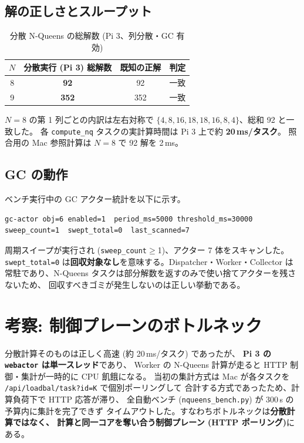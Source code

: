 \documentclass[a4paper,11pt]{ltjsarticle}
\begin{document}
\subsection{解の正しさとスループット}
\begin{table}[h]\centering
\begin{tabular}{cccc}
\toprule
$N$ & 分散実行 (Pi 3) 総解数 & 既知の正解 & 判定 \\
\midrule
8 & \textbf{92}  & 92  & 一致 \\
9 & \textbf{352} & 352 & 一致 \\
\bottomrule
\end{tabular}
\caption{分散 N-Queens の総解数 (Pi 3、列分散・GC 有効)}
\end{table}

$N=8$ の第 1 列ごとの内訳は左右対称で
$\{4,8,16,18,18,16,8,4\}$、総和 92 と一致した。
各 \texttt{compute\_nq} タスクの実計算時間は Pi 3 上で約 \textbf{20\,ms/タスク}。
照合用の Mac 参照計算は $N=8$ で 92 解を 2\,ms。

\subsection{GC の動作}
ベンチ実行中の GC アクター統計を以下に示す。
\begin{lstlisting}
gc-actor obj=6 enabled=1  period_ms=5000 threshold_ms=30000
sweep_count=1  swept_total=0  last_scanned=7
\end{lstlisting}
周期スイープが実行され (\texttt{sweep\_count}$\ge$1)、アクター 7 体をスキャンした。
\texttt{swept\_total=0} は\textbf{回収対象なし}を意味する。Dispatcher・Worker・Collector
は常駐であり、N-Queens タスクは部分解数を返すのみで使い捨てアクターを残さないため、
回収すべきゴミが発生しないのは正しい挙動である。

\section{考察: 制御プレーンのボトルネック}
分散計算そのものは正しく高速 (約 20\,ms/タスク) であったが、
\textbf{Pi 3 の \texttt{webactor} は単一スレッド}であり、
Worker の N-Queens 計算が走ると HTTP 制御・集計が一時的に CPU 飢餓になる。
当初の集計方式は Mac が各タスクを \texttt{/api/loadbal/task?id=K} で個別ポーリングして
合計する方式であったため、計算負荷下で HTTP 応答が滞り、
全自動ベンチ (\texttt{nqueens\_bench.py}) が 300\,s の予算内に集計を完了できず
タイムアウトした。すなわちボトルネックは\textbf{分散計算ではなく、
計算と同一コアを奪い合う制御プレーン (HTTP ポーリング)}にある。
\end{document}
